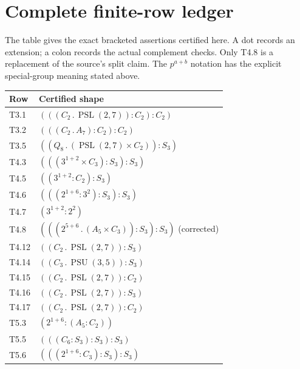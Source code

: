 \documentclass[11pt,a4paper]{article}
\begin{document}
\section{Complete finite-row ledger}
The table gives the exact bracketed assertions certified here. A dot
records an extension; a colon records the actual complement checks.
Only T4.8 is a replacement of the source's split claim. The $p^{a+b}$
notation has the explicit special-group meaning stated above.
\begingroup\small
\begin{longtable}{@{}lp{133mm}@{}}
\toprule Row & Certified shape\\\midrule\endhead
T3.1 & $(((C_{2}\mathbin{.}\allowbreak \operatorname{PSL}(2,7)):\allowbreak C_{2}):\allowbreak C_{2})$\\
T3.2 & $(((C_{2}\mathbin{.}\allowbreak A_{7}):\allowbreak C_{2}):\allowbreak C_{2})$\\
T3.5 & $((Q_8\mathbin{.}\allowbreak (\operatorname{PSL}(2,7)\times\allowbreak C_{2})):\allowbreak S_{3})$\\
T4.3 & $(((3^{1+2}\times\allowbreak C_{3}):\allowbreak S_{3}):\allowbreak S_{3})$\\
T4.5 & $((3^{1+2}:\allowbreak C_{2}):\allowbreak S_{3})$\\
T4.6 & $(((2^{1+6}:\allowbreak 3^{2}):\allowbreak S_{3}):\allowbreak S_{3})$\\
T4.7 & $(3^{1+2}:\allowbreak 2^{2})$\\
T4.8 & $(((2^{5+6}\mathbin{.}\allowbreak (A_{5}\times\allowbreak C_{3})):\allowbreak S_{3}):\allowbreak S_{3})$ (corrected)\\
T4.12 & $((C_{2}\mathbin{.}\allowbreak \operatorname{PSL}(2,7)):\allowbreak S_{3})$\\
T4.14 & $((C_{3}\mathbin{.}\allowbreak \operatorname{PSU}(3,5)):\allowbreak S_{3})$\\
T4.15 & $((C_{2}\mathbin{.}\allowbreak \operatorname{PSL}(2,7)):\allowbreak C_{2})$\\
T4.16 & $((C_{2}\mathbin{.}\allowbreak \operatorname{PSL}(2,7)):\allowbreak S_{3})$\\
T4.17 & $((C_{2}\mathbin{.}\allowbreak \operatorname{PSL}(2,7)):\allowbreak C_{2})$\\
T5.3 & $(2^{1+6}:\allowbreak (A_{5}:\allowbreak C_{2}))$\\
T5.5 & $(((C_{6}:\allowbreak S_{3}):\allowbreak S_{3}):\allowbreak S_{3})$\\
T5.6 & $(((2^{1+6}:\allowbreak C_{3}):\allowbreak S_{3}):\allowbreak S_{3})$\\

\end{longtable}
\end{document}
